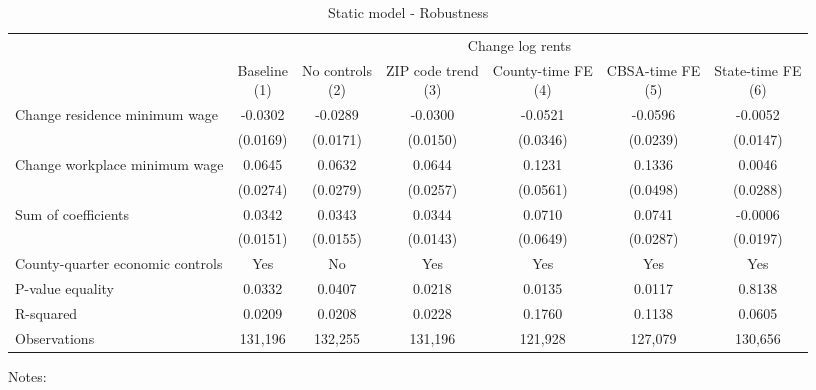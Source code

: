 \begin{table}
    \caption{Static model - Robustness}
    \label{tab:static_robust}
    \centering

    \begin{tabular}{@{}lcccccc@{}}
        \toprule
                                                  & \multicolumn{6}{c}{Change log rents}                                          \\ \cmidrule(l){2-7}
                                                  & \shortstack{Baseline\\(1)}       & \shortstack{No controls\\(2)} & \shortstack{ZIP code trend\\(3)} 
                                                  & \shortstack{County-time FE\\(4)} & \shortstack{CBSA-time FE\\(5)} & \shortstack{State-time FE\\(6)} \\ \midrule
        Change residence minimum wage             & -0.0302      & -0.0289         & -0.0300       & -0.0521        & -0.0596       & -0.0052             \\
                                                  & (0.0169)    & (0.0171)       & (0.0150)     & (0.0346)      & (0.0239)     & (0.0147)           \\
        Change workplace minimum wage             & 0.0645      & 0.0632         & 0.0644       & 0.1231        & 0.1336       & 0.0046             \\
                                                  & (0.0274)    & (0.0279)       & (0.0257)     & (0.0561)      & (0.0498)     & (0.0288)           \\
        Sum of coefficients                       & 0.0342      & 0.0343         & 0.0344       & 0.0710        & 0.0741       & -0.0006             \\
                                                  & (0.0151)    & (0.0155)       & (0.0143)     & (0.0649)      & (0.0287)     & (0.0197)           \\ \midrule
        County-quarter economic controls               & Yes      &  No         & Yes       & Yes        & Yes       & Yes             \\
        P-value equality                          & 0.0332      & 0.0407         & 0.0218       & 0.0135        & 0.0117       & 0.8138             \\
        R-squared                                 & 0.0209      & 0.0208         & 0.0228       & 0.1760        & 0.1138       & 0.0605             \\
        Observations                              & 131,196     & 132,255        & 131,196      & 121,928       & 127,079      & 130,656            \\ \bottomrule
    \end{tabular}

    \begin{minipage}{.95\textwidth} \footnotesize
        \vspace{2mm}
        Notes: 
    \end{minipage}
\end{table}
